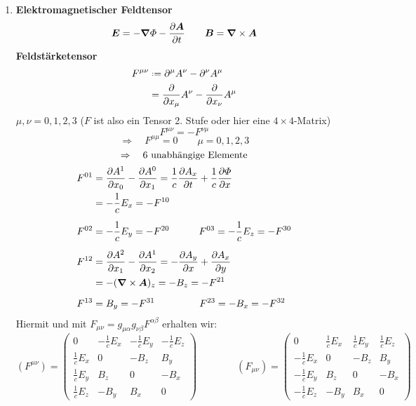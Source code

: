 \begin{enumerate}[1)]
	\item \textbf{Elektromagnetischer Feldtensor}
	\begin{equation*}
	\bm{E} = - \bm{\nabla} \varPhi - \frac{\partial \bm{A}}{\partial t} \qquad \bm{B} = \bm{\nabla} \times \bm{A}
	\end{equation*}
	\textbf{Feldstärketensor}
	\begin{align*}
	F^{\mu \nu} &\defeq \partial^{\mu} A^{\nu} - \partial^{\nu} A^{\mu}\\
	&= \prt{}{x_{\mu}} A^{\nu} - \prt{}{x_{\nu}} A^{\mu}
	\end{align*}
	$ \mu, \nu = 0, 1, 2, 3 $ ($ F $ ist also ein Tensor 2. Stufe oder hier eine $ 4 \times 4 $-Matrix)
	\begin{equation*}
	F^{\mu \nu} = - F^{\nu \mu}
	\end{equation*}
	\begin{equation*}
	\Rightarrow \quad F^{\mu \mu} = 0 \qquad \mu = 0, 1, 2, 3
	\end{equation*}
	\begin{equation*}
	\Rightarrow \quad 6 \textrm{ unabhängige Elemente}
	\end{equation*}
	\begin{align*}
	F^{01} &= \frac{\partial A^{1}}{\partial x_0} - \frac{\partial A^0}{\partial x_1} = \frac{1}{c} \frac{\partial A_x}{\partial t} + \frac{1}{c} \frac{\partial \varPhi}{\partial x}\\
	&= - \frac{1}{c} E_x = - F^{10}\\[5pt]
	F^{02} &= - \frac{1}{c} E_y = - F^{20} \qquad \quad F^{03} = - \frac{1}{c} E_z = - F^{30} \\[5pt]
	F^{12} &= \frac{\partial A^2}{\partial x_1} - \frac{\partial A^1}{\partial x_2} = - \frac{\partial A_y}{\partial x} + \frac{\partial A_x}{\partial y}\\
	&= - (\bm{\nabla} \times \bm{A})_z = - B_z = - F^{21}\\[5pt]
	F^{13} &= B_y = - F^{31} \qquad \qquad \ \: F^{23} = - B_x = - F^{32}
	\end{align*}
	Hiermit und mit $ F_{\mu \nu} = g_{\mu \alpha} g_{\nu \beta} F^{\alpha \beta} $ erhalten wir:
	\begin{equation*}
	(F^{\mu \nu}) = \begin{pmatrix}
	0 & - \frac{1}{c} E_x & - \frac{1}{c} E_y & - \frac{1}{c} E_z \\[10pt]
	\frac{1}{c} E_x & 0 & - B_z & B_y \\[10pt]
	\frac{1}{c} E_y & B_z & 0 & - B_x \\[10pt]
	\frac{1}{c} E_z & - B_y & B_x & 0
	\end{pmatrix} \qquad \qquad
	(F_{\mu \nu}) = \begin{pmatrix}
	0 & \frac{1}{c} E_x & \frac{1}{c} E_y & \frac{1}{c} E_z \\[10pt]
	- \frac{1}{c} E_x & 0 & - B_z & B_y \\[10pt]
	- \frac{1}{c} E_y & B_z & 0 & - B_x \\[10pt]
	- \frac{1}{c} E_z & - B_y & B_x & 0
	\end{pmatrix}
	\end{equation*}
\end{enumerate}

